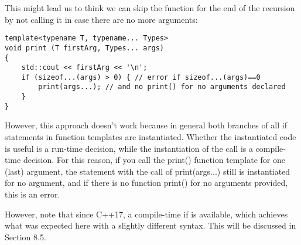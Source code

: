 This might lead us to think we can skip the function for the end of the recursion by not calling it in case there are no more arguments:

\begin{lstlisting}[style=styleCXX]
template<typename T, typename... Types>
void print (T firstArg, Types... args)
{
	std::cout << firstArg << '\n';
	if (sizeof...(args) > 0) { // error if sizeof...(args)==0
		print(args...); // and no print() for no arguments declared
	}
}
\end{lstlisting}

However, this approach doesn’t work because in general both branches of all if statements in function templates are instantiated. Whether the instantiated code is useful is a run-time decision, while the instantiation of the call is a compile-time decision. For this reason, if you call the print() function template for one (last) argument, the statement with the call of print(args...) still is instantiated for no argument, and if there is no function print() for no arguments provided, this is an error.

However, note that since C++17, a compile-time if is available, which achieves what was expected here with a slightly different syntax. This will be discussed in Section 8.5.
























